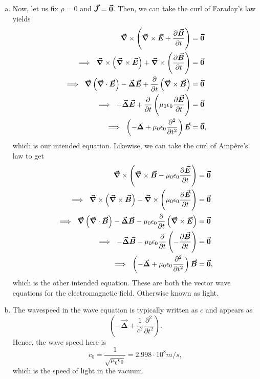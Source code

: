 \documentclass[12pt]{article} %
\newcommand{\grad}{\boldsymbol{\vec{\nabla}}}
\newcommand{\vecfieldE}{\boldsymbol{\vec{E}}}
\newcommand{\vecfieldB}{\boldsymbol{\vec{B}}}
\newcommand{\vecfieldJ}{\boldsymbol{\vec{J}}}
\newcommand{\veclaplace}{\boldsymbol{\vec{\Delta}}}
\begin{document}
\begin{solution}
\begin{enumerate}[(a)]
    \item Now, let us fix $\rho=0$ and $\vecfieldJ=\zerovec$.  Then, we can take the curl of Faraday's law yields
        \begin{align*}
            \grad \times \left(\grad \times \vecfieldE +  \frac{\partial \vecfieldB}{\partial t} \right) &=\zerovec\\
            \implies ~ \grad \times \left(\grad \times \vecfieldE\right) + \grad \times \left(\frac{\partial \vecfieldB}{\partial t} \right)&=\zerovec \\
            \implies ~ \grad \left( \grad \cdot \vecfieldE\right)-\veclaplace \vecfieldE + \frac{\partial}{\partial t} \left( \grad \times \vecfieldB\right)&=\zerovec\\
            \implies ~ -\veclaplace \vecfieldE +  \frac{\partial}{\partial t} \left(\mu_0 \epsilon_0 \frac{\partial \vecfieldE}{\partial t}\right) &= \zerovec\\
            \implies ~ \left( - \veclaplace + \mu_0 \epsilon_0 \frac{\partial^2 }{\partial t^2}\right) \vecfieldE &= \zerovec,
        \end{align*}
        which is our intended equation.  Likewise, we can take the curl of Amp\`ere's law to get
    \begin{align*}
        \grad \times \left(\grad \times \vecfieldB - \mu_0 \epsilon_0 \frac{\partial \vecfieldE}{\partial t} \right) &=\zerovec\\
        \implies ~ \grad \times \left(\grad \times \vecfieldB\right) - \grad \times \left(\mu_0 \epsilon_0\frac{\partial \vecfieldE}{\partial t} \right)&=\zerovec \\
        \implies ~ \grad \left( \grad \cdot \vecfieldB\right)-\veclaplace \vecfieldB - \mu_0\epsilon_0\frac{\partial}{\partial t} \left( \grad \times \vecfieldE\right)&=\zerovec\\
        \implies ~ -\veclaplace \vecfieldB - \mu_0 \epsilon_0 \frac{\partial}{\partial t} \left(-\frac{\partial \vecfieldB}{\partial t}\right) &= \zerovec\\
        \implies ~ \left( - \veclaplace + \mu_0 \epsilon_0 \frac{\partial^2 }{\partial t^2}\right) \vecfieldB &= \zerovec,
    \end{align*}
    which is the other intended equation. These are both the vector wave equations for the electromagnetic field. Otherwise known as light.
    
    \item The wavespeed in the wave equation is typically written as $c$ and appears as
    \[
    \left( - \veclaplace + \frac{1}{c^2} \frac{\partial^2 }{\partial t^2}\right).
    \]
    Hence, the wave speed here is
    \[
    c_0 = \frac{1}{\sqrt{\mu_0\epsilon_0}} = 2.998 \cdot 10^8 m/s,
    \]
    which is the speed of light in the vacuum.
\end{enumerate}
\end{solution}
\end{document}
